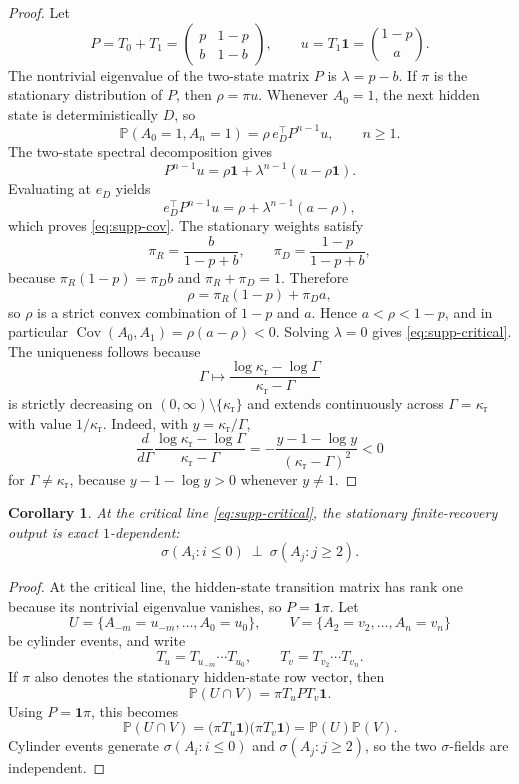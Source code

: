\documentclass[11pt]{amsart}
\numberwithin{equation}{section}
\newtheorem{corollary}[proposition]{Corollary}
\theoremstyle{remark}
\newcommand{\PP}{\mathbb{P}}
\begin{document}
\begin{proof}
Let
\[
P=T_0+T_1=
\begin{pmatrix}
 p & 1-p\\
 b & 1-b
\end{pmatrix},
\qquad
u=T_1\mathbf 1=\binom{1-p}{a}.
\]
The nontrivial eigenvalue of the two-state matrix $P$ is $\lambda=p-b$. If $\pi$ is the stationary distribution of $P$, then $\rho=\pi u$. Whenever $A_0=1$, the next hidden state is deterministically $D$, so
\[
\PP(A_0=1,A_n=1)=\rho\, e_D^\top P^{n-1}u,\qquad n\ge1.
\]
The two-state spectral decomposition gives
\[
P^{n-1}u=\rho\mathbf 1+\lambda^{n-1}(u-\rho\mathbf 1).
\]
Evaluating at $e_D$ yields
\[
e_D^\top P^{n-1}u=\rho+\lambda^{n-1}(a-\rho),
\]
which proves \cref{eq:supp-cov}. The stationary weights satisfy
\[
\pi_R=\frac{b}{1-p+b},
\qquad
\pi_D=\frac{1-p}{1-p+b},
\]
because $\pi_R(1-p)=\pi_D b$ and $\pi_R+\pi_D=1$. Therefore
\[
\rho=\pi_R(1-p)+\pi_D a,
\]
so $\rho$ is a strict convex combination of $1-p$ and $a$. Hence $a<\rho<1-p$, and in particular $\operatorname{Cov}(A_0,A_1)=\rho(a-\rho)<0$. Solving $\lambda=0$ gives \cref{eq:supp-critical}. The uniqueness follows because
\[
\Gamma\longmapsto \frac{\log\kappa_{\mathrm r}-\log\Gamma}{\kappa_{\mathrm r}-\Gamma}
\]
is strictly decreasing on $(0,\infty)\setminus\{\kappa_{\mathrm r}\}$ and extends continuously across $\Gamma=\kappa_{\mathrm r}$ with value $1/\kappa_{\mathrm r}$. Indeed, with $y=\kappa_{\mathrm r}/\Gamma$,
\[
\frac{d}{d\Gamma}
\frac{\log\kappa_{\mathrm r}-\log\Gamma}{\kappa_{\mathrm r}-\Gamma}
=
-\frac{y-1-\log y}{(\kappa_{\mathrm r}-\Gamma)^2}<0
\]
for $\Gamma\neq\kappa_{\mathrm r}$, because $y-1-\log y>0$ whenever $y\neq1$.
\end{proof}

\begin{corollary}\label{cor:supp-1dep}
At the critical line \cref{eq:supp-critical}, the stationary finite-recovery output is exact $1$-dependent:
\[
\sigma(A_i:i\le0)\ \perp\ \sigma(A_j:j\ge2).
\]
\end{corollary}

\begin{proof}
At the critical line, the hidden-state transition matrix has rank one because its nontrivial eigenvalue vanishes, so $P=\mathbf 1\pi$. Let
\[
U=\{A_{-m}=u_{-m},\dots,A_0=u_0\},
\qquad
V=\{A_2=v_2,\dots,A_n=v_n\}
\]
be cylinder events, and write
\[
T_u=T_{u_{-m}}\cdots T_{u_0},
\qquad
T_v=T_{v_2}\cdots T_{v_n}.
\]
If $\pi$ also denotes the stationary hidden-state row vector, then
\[
\PP(U\cap V)=\pi T_uPT_v\mathbf 1.
\]
Using $P=\mathbf 1\pi$, this becomes
\[
\PP(U\cap V)=\bigl(\pi T_u\mathbf 1\bigr)\bigl(\pi T_v\mathbf 1\bigr)=\PP(U)\PP(V).
\]
Cylinder events generate $\sigma(A_i:i\le0)$ and $\sigma(A_j:j\ge2)$, so the two $\sigma$-fields are independent.
\end{proof}
\end{document}
